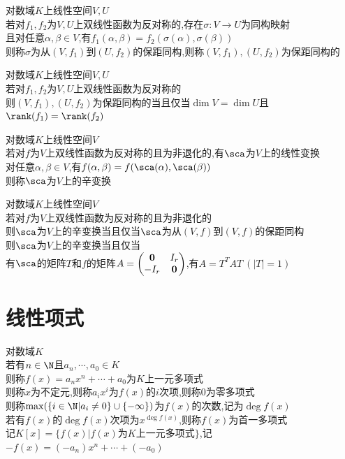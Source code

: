 \begin{dingli}
对数域$K$上线性空间$V,U$\\
若对$f_1,f_2$为$V,U$上双线性函数为反对称的,存在$\sigma:V\to U$为同构映射\\
且对任意$\alpha,\beta\in V$,有$f_1(\alpha,\beta)=f_2(\sigma(\alpha),\sigma(\beta))$\\
则称$\sigma$为从$(V,f_1)$到$(U,f_2)$的保距同构,则称$(V,f_1),(U,f_2)$为保距同构的
\end{dingli}

\begin{dingli}
对数域$K$上线性空间$V,U$\\
若对$f_1,f_2$为$V,U$上双线性函数为反对称的\\
则$(V,f_1),(U,f_2)$为保距同构的当且仅当$\dim V=\dim U$且$\rank(f_1)=\rank(f_2)$
\end{dingli}

\begin{dingyi}
对数域$K$上线性空间$V$\\
若对$f$为$V$上双线性函数为反对称的且为非退化的,有$\sca$为$V$上的线性变换\\
对任意$\alpha,\beta\in V$,有$f(\alpha,\beta)=f(\sca(\alpha),\sca(\beta))$\\
则称$\sca$为$V$上的辛变换
\end{dingyi}

\begin{dingli}
对数域$K$上线性空间$V$\\
若对$f$为$V$上双线性函数为反对称的且为非退化的\\
则$\sca$为$V$上的辛变换当且仅当$\sca$为从$(V,f)$到$(V,f)$的保距同构\\
则$\sca$为$V$上的辛变换当且仅当\\
有$\sca$的矩阵$T$和$f$的矩阵$A=\begin{pmatrix}\bf0&I_r\\-I_r&\bf0\end{pmatrix}$,有$A=T^{T}AT\ (|T|=1)$
\end{dingli}

\chapter{线性项式}

\begin{dingyi}
对数域$K$\\
若有$n\in\N$且$a_n,\cdots,a_0\in K$\\
则称$f(x)=a_nx^n+\cdots+a_0$为$K$上一元多项式\\
则称$x$为不定元,则称$a_ix^i$为$f(x)$的$i$次项,则称$0$为零多项式\\
则称$\max(\{i\in\N|a_i\neq 0\}\cup\{-\infty\})$为$f(x)$的次数,记为$\deg f(x)$\\
若有$f(x)$的$\deg f(x)$次项为$x^{\deg f(x)}$,则称$f(x)$为首一多项式\\
记$K[x]=\{f(x)|f(x)\text{为}K\text{上一元多项式}\}$,记$-f(x)=(-a_n)x^n+\cdots+(-a_0)$
\end{dingyi}


